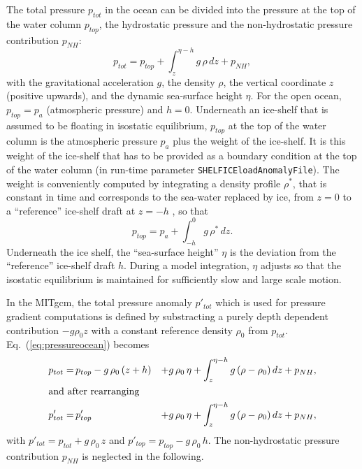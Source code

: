The total pressure $p_{tot}$ in the ocean can be divided into the
pressure at the top of the water column $p_{top}$, the hydrostatic
pressure and the non-hydrostatic pressure contribution $p_{NH}$:
\begin{equation}
  \label{eq:pressureocean}
  p_{tot} = p_{top} + \int_z^{\eta-h} g\,\rho\,dz + p_{NH}, 
\end{equation}
with the gravitational acceleration $g$, the density $\rho$, the
vertical coordinate $z$ (positive upwards), and the dynamic
sea-surface height $\eta$. For the open ocean, $p_{top}=p_{a}$
(atmospheric pressure) and $h=0$. Underneath an ice-shelf that is
assumed to be floating in isostatic equilibrium, $p_{top}$ at the top
of the water column is the atmospheric pressure $p_{a}$ plus the
weight of the ice-shelf. It is this weight of the ice-shelf that has
to be provided as a boundary condition at the top of the water column
(in run-time parameter \texttt{SHELFICEloadAnomalyFile}).
The weight is conveniently computed by integrating a density profile
$\rho^*$, that is constant in time and corresponds to the sea-water
replaced by ice, from $z=0$ to a ``reference'' ice-shelf draft at
$z=-h$ \citep{beckmann99}, so that
\begin{equation}
  \label{eq:ptop}
  p_{top} = p_{a} + \int_{-h}^{0}g\,\rho^{*}\,dz.
\end{equation}
Underneath the ice shelf, the ``sea-surface height'' $\eta$ is the
deviation from the ``reference'' ice-shelf draft $h$. During a model
integration, $\eta$ adjusts so that the isostatic equilibrium is
maintained for sufficiently slow and large scale motion.
  
In the MITgcm, the total pressure anomaly $p'_{tot}$ which is used for
pressure gradient computations is defined by substracting a purely
depth dependent contribution $-g\rho_{0}z$ with a constant reference
density $\rho_{0}$ from $p_{tot}$.  Eq.~(\ref{eq:pressureocean}) becomes
\begin{alignat}{2}
  \label{eq:pressure}
  p_{tot} =& \,p_{top} - g\,\rho_0\,(z+h)  &+ g\,\rho_0\,\eta + \int_z^{\eta-h}
  g\,(\rho-\rho_0)\,dz +   p_{NH}, \\
  \intertext{and after rearranging}
  p'_{tot} =& \,p'_{top}
  &+ g\,\rho_0\,\eta + \int_z^{\eta-h}g\,(\rho-\rho_0)\,dz +   p_{NH}, 
\end{alignat}
with $p'_{tot} = p_{tot} + g\,\rho_0\,z$ and $p'_{top} = p_{top} -
g\,\rho_0\,h$. The non-hydrostatic pressure contribution $p_{NH}$ is
neglected in the following.

